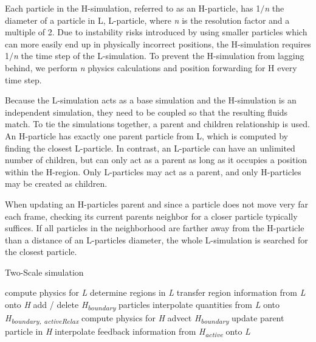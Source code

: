 \documentclass[../../main.tex]{subfiles}
\begin{document}
Each particle in the H-simulation, referred to as an H-particle, has 1$/$\textit{n} the diameter of a particle in L, L-particle, where \textit{n} is the resolution factor and a multiple of 2. Due to instability risks introduced by using smaller particles which can more easily end up in physically incorrect positions, the H-simulation requires 1$/$\textit{n} the time step of the L-simulation. To prevent the H-simulation from lagging behind, we perform \textit{n} physics calculations and position forwarding for H every time step. 

Because the L-simulation acts as a base simulation and the H-simulation is an independent simulation, they need to be coupled so that the resulting fluids match. To tie the simulations together, a parent and children relationship is used. An H-particle has exactly one parent particle from L, which is computed by finding the closest L-particle. In contrast, an L-particle can have an unlimited number of children, but can only act as a parent as long as it occupies a position within the H-region. Only L-particles may act as a parent, and only H-particles may be created as children. 

When updating an H-particles parent and since a particle does not move very far each frame, checking its current parents neighbor for a closer particle typically suffices. If all particles in the neighborhood are farther away from the H-particle than a distance of an L-particles diameter, the whole L-simulation is searched for the closest particle. 

\begin{algorithm}[h]
    \caption{Two-Scale simulation}
    \label{alg:twoscale}
    \begin{algorithmic}[1]
        \State compute physics for \textit{L}
        \State determine regions in \textit{L}
        \State transfer region information from \textit{L} onto \textit{H}
        \State add / delete \textit{\texorpdfstring{H\textsubscript{boundary}}{H boundary}} particles
        \State interpolate quantities from \textit{L} onto \textit{\texorpdfstring{H\textsubscript{boundary, activeRelax}}{H boundary, activeRelax}}
                \State compute physics for \textit{H}
            \State advect \textit{\texorpdfstring{H\textsubscript{boundary}}{H boundary}}
        \EndFor
        \State update parent particle in \textit{H}
        \State interpolate feedback information from \textit{{\texorpdfstring{H\textsubscript{active}}{H active}}} onto \textit{L}
        \EndWhile
   \end{algorithmic}
\end{algorithm}
\end{document}
